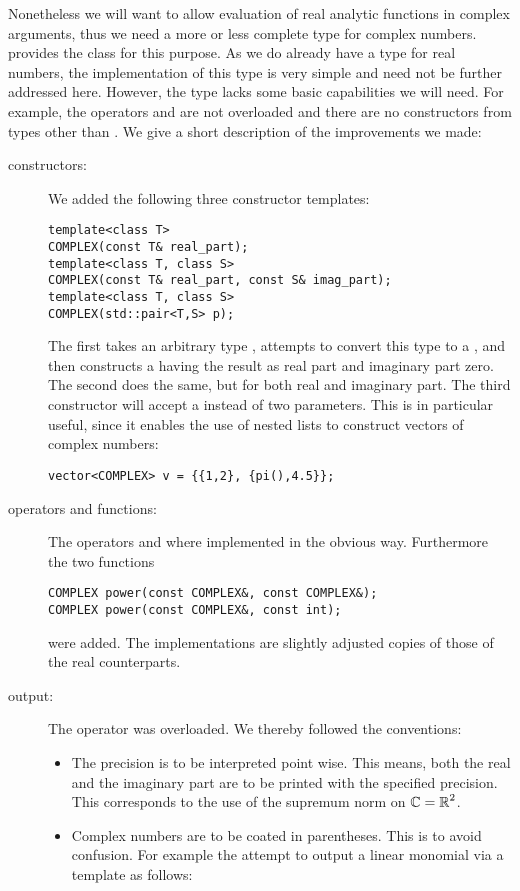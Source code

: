 Nonetheless we will want to allow evaluation of real analytic functions in complex arguments, thus we need a more or less complete type for complex numbers. \irram provides the class  for this purpose. As we do already have a type for real numbers, the implementation of this type is very simple and need not be further addressed here. However, the type lacks some basic capabilities we will need. For example, the operators \ir{<<} and \code{+=} are not overloaded and there are no constructors from types other than . We give a short description of the improvements we made:
\begin{description}
\item[constructors:] We added the following three constructor templates:
\begin{lstlisting}
template<class T>
COMPLEX(const T& real_part);
template<class T, class S>
COMPLEX(const T& real_part, const S& imag_part);
template<class T, class S>
COMPLEX(std::pair<T,S> p);
\end{lstlisting}
The first takes an arbitrary type , attempts to convert this type to a , and then constructs a  having the result as real part and imaginary part zero. The second does the same, but for both real and imaginary part. The third constructor will accept a  instead of two parameters. This is in particular useful, since it enables the use of nested lists to construct vectors of complex numbers:
\begin{lstlisting}
vector<COMPLEX> v = {{1,2}, {pi(),4.5}};
\end{lstlisting}
\item[operators and functions:] The operators \code{+=} and \code{*=} where implemented in the obvious way. Furthermore the two functions
\begin{lstlisting}
COMPLEX power(const COMPLEX&, const COMPLEX&);
COMPLEX power(const COMPLEX&, const int);
\end{lstlisting}
were added. The implementations are slightly adjusted copies of those of the real counterparts.
\item[output:] The operator \ir{<<} was overloaded. We thereby followed the conventions:
\begin{itemize}
\item The precision is to be interpreted point wise. This means, both the real and the imaginary part are to be printed with the specified precision. This corresponds to the use of the supremum norm on $\operatorname{\mathbb{C}} = \operatorname{\mathbb{R}}^2$.
\item Complex numbers are to be coated in parentheses. This is to avoid confusion. For example the attempt to output a linear monomial via a template as follows:

\end{itemize}
\end{description}
